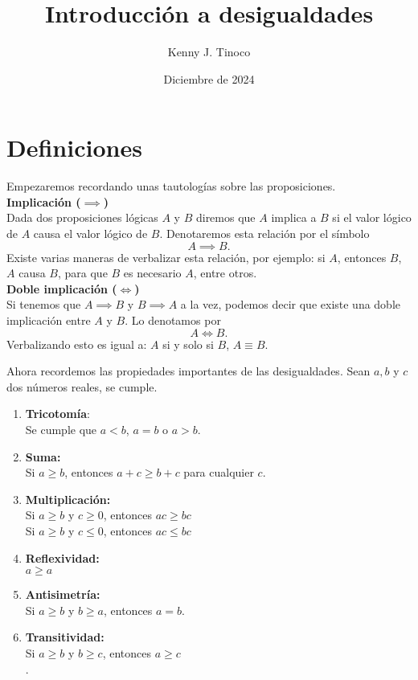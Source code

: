 \documentclass[12pt]{article}
\title{Introducción a desigualdades}
\author{Kenny J. Tinoco}
\date{Diciembre de 2024}
\begin{document}
    \maketitle

    \section{Definiciones}
    Empezaremos recordando unas tautologías sobre las proposiciones.\\

    \textbf{Implicación ($\implies$)}\\
    Dada dos proposiciones lógicas $A$ y $B$ diremos que $A$ implica a $B$ si el valor lógico de $A$ causa el valor lógico de $B$.
    Denotaremos esta relación por el símbolo
    \[
        A \implies B.
    \]
    Existe varias maneras de verbalizar esta relación, por ejemplo: si $A$, entonces $B$, $A$ causa $B$, para que $B$ es necesario $A$, entre otros.\\

    \textbf{Doble implicación ($\iff$)}\\
    Si tenemos que $A \implies B$ y $B \implies A$ a la vez, podemos decir que existe una doble implicación entre $A$ y $B$.
    Lo denotamos por
    \[
        A \iff B.
    \]
    Verbalizando esto es igual a: $A$ si y solo si $B$, $A \equiv B$.

    Ahora recordemos las propiedades importantes de las desigualdades.
    Sean $a, b$ y $c$ dos números reales, se cumple.
    \begin{multicols}{2}
        \begin{enumerate}
            \item \textbf{Tricotomía}:\\ Se cumple que $a < b$, $a = b$ o $a > b$.
            \item \textbf{Suma:}\\ Si $a \geq b$, entonces $a + c \geq b + c$ para cualquier $c$.
            \item \textbf{Multiplicación:}\\
            Si $a \geq b$ y $c \geq 0$, entonces $ac \geq bc$\\
            Si $a \geq b$ y $c \leq 0$, entonces $ac \leq bc$
            \item \textbf{Reflexividad:}\\ $a \geq a$
            \item \textbf{Antisimetría:}\\ Si $a \geq b$ y $b\geq a$, entonces $a = b$.
            \item \textbf{Transitividad:}\\ Si $a \geq b$ y $b \geq c$, entonces $a \geq c$\\.
        \end{enumerate}
    \end{multicols}
\end{document}
